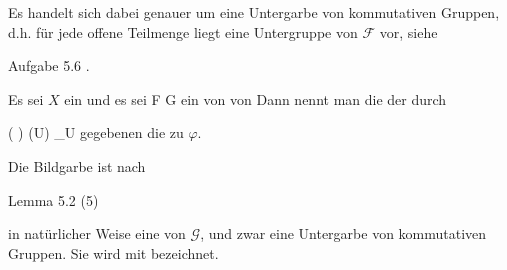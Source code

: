 Es handelt sich dabei genauer um eine Untergarbe von kommutativen Gruppen, d.h. für jede offene Teilmenge liegt eine Untergruppe von ${ \mathcal F  }$ vor, siehe

Aufgabe 5.6
.


{}
{





Es sei $X$ ein
und es sei
\maabb {\varphi} { { \mathcal  F   } } { { \mathcal  G   }
} {}
ein
von
von
Dann nennt man die
der durch

\mavergleichskettedisp
{\vergleichskette
{ \left(   \varphi  \right) (U)
}
{ } {  \varphi_U
}
{ } {
}
{ } {
}
{ } {
}
}
{}{}{}
gegebenen
die
zu $\varphi$.





}

Die Bildgarbe ist nach

Lemma 5.2  (5)

in natürlicher Weise eine
von ${ \mathcal G  }$, und zwar eine Untergarbe von kommutativen Gruppen. Sie wird mit
 bezeichnet.

